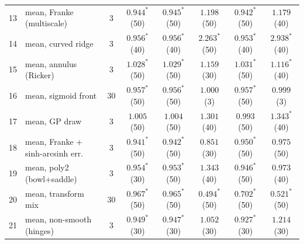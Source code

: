 \begin{tabular}{clcccccc}
13 & mean, Franke (multiscale) & 3 & $0.944^{*}$ {\tiny(50)} & $0.945^{*}$ {\tiny(50)} & $1.198$ {\tiny(50)} & $0.942^{*}$ {\tiny(50)} & $1.179$ {\tiny(40)} \\
14 & mean, curved ridge & 3 & $0.956^{*}$ {\tiny(40)} & $0.956^{*}$ {\tiny(40)} & $2.263^{*}$ {\tiny(50)} & $0.953^{*}$ {\tiny(40)} & $2.938^{*}$ {\tiny(40)} \\
15 & mean, annulus (Ricker) & 3 & $1.028^{*}$ {\tiny(50)} & $1.029^{*}$ {\tiny(50)} & $1.159$ {\tiny(30)} & $1.031^{*}$ {\tiny(50)} & $1.116^{*}$ {\tiny(40)} \\
16 & mean, sigmoid front & 30 & $0.957^{*}$ {\tiny(50)} & $0.956^{*}$ {\tiny(50)} & $1.000$ {\tiny(3)} & $0.957^{*}$ {\tiny(50)} & $0.999$ {\tiny(3)} \\
17 & mean, GP draw & 3 & $1.005$ {\tiny(50)} & $1.004$ {\tiny(50)} & $1.301$ {\tiny(40)} & $0.993$ {\tiny(50)} & $1.343^{*}$ {\tiny(40)} \\
18 & mean, Franke + sinh-arcsinh err. & 3 & $0.941^{*}$ {\tiny(50)} & $0.942^{*}$ {\tiny(50)} & $0.851$ {\tiny(30)} & $0.950^{*}$ {\tiny(50)} & $0.975$ {\tiny(50)} \\
19 & mean, poly2 (bowl+saddle) & 3 & $0.954^{*}$ {\tiny(30)} & $0.953^{*}$ {\tiny(50)} & $1.343$ {\tiny(40)} & $0.946^{*}$ {\tiny(50)} & $0.973$ {\tiny(40)} \\
20 & mean, transform mix & 30 & $0.967^{*}$ {\tiny(50)} & $0.965^{*}$ {\tiny(50)} & $\mathbf{0.494^{*}}$ {\tiny(50)} & $\mathbf{0.702^{*}}$ {\tiny(50)} & $\mathbf{0.521^{*}}$ {\tiny(50)} \\
21 & mean, non-smooth (hinges) & 3 & $0.949^{*}$ {\tiny(30)} & $0.947^{*}$ {\tiny(30)} & $1.052$ {\tiny(30)} & $0.927^{*}$ {\tiny(30)} & $1.214$ {\tiny(30)} \\
\bottomrule
\end{tabular}
